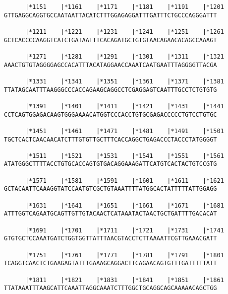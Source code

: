 \documentclass{article}
\begin{document}
\begin{Verbatim}
      |*1151    |*1161    |*1171    |*1181    |*1191    |*1201
GTTGAGGCAGGTGCCAATAATTACATCTTTGGAGAGGATTTGATTTCTGCCCAGGGATTT
                                                            
      |*1211    |*1221    |*1231    |*1241    |*1251    |*1261
GCTCACCCCAAGGTCATCTGATAATTTCACAGATGCTGTGTAACAGAACACAGCCAAAGT
                                                            
      |*1271    |*1281    |*1291    |*1301    |*1311    |*1321
AAACTGTGTAGGGGAGCCACATTTACATAGGAACCAAATCAATGAATTTAGGGGTTACGA
                                                            
      |*1331    |*1341    |*1351    |*1361    |*1371    |*1381
TTATAGCAATTTAAGGGCCCACCAGAAGCAGGCCTCGAGGAGTCAATTTGCCTCTGTGTG
                                                            
      |*1391    |*1401    |*1411    |*1421    |*1431    |*1441
CCTCAGTGGAGACAAGTGGGAAAACATGGTCCCACCTGTGCGAGACCCCCTGTCCTGTGC
                                                            
      |*1451    |*1461    |*1471    |*1481    |*1491    |*1501
TGCTCACTCAACAACATCTTTGTGTTGCTTTCACCAGGCTGAGACCCTACCCTATGGGGT
                                                            
      |*1511    |*1521    |*1531    |*1541    |*1551    |*1561
ATATGGGCTTTTACCTGTGCACCAGTGTGACAGGAAAGATTCATGTCACTACTGTCCGTG
                                                            
      |*1571    |*1581    |*1591    |*1601    |*1611    |*1621
GCTACAATTCAAAGGTATCCAATGTCGCTGTAAATTTTATGGCACTATTTTTATTGGAGG
                                                            
      |*1631    |*1641    |*1651    |*1661    |*1671    |*1681
ATTTGGTCAGAATGCAGTTGTTGTACAACTCATAAATACTAACTGCTGATTTTGACACAT
                                                            
      |*1691    |*1701    |*1711    |*1721    |*1731    |*1741
GTGTGCTCCAAATGATCTGGTGGTTATTTAACGTACCTCTTAAAATTCGTTGAAACGATT
                                                            
      |*1751    |*1761    |*1771    |*1781    |*1791    |*1801
TCAGGTCAACTCTGAAGAGTATTTGAAAGCAGGACTTCAGAACAGTGTTTGATTTTTATT
                                                            
      |*1811    |*1821    |*1831    |*1841    |*1851    |*1861
TTATAAATTTAAGCATTCAAATTAGGCAAATCTTTGGCTGCAGGCAGCAAAAACAGCTGG
                                                            

\end{Verbatim}
\end{document}
